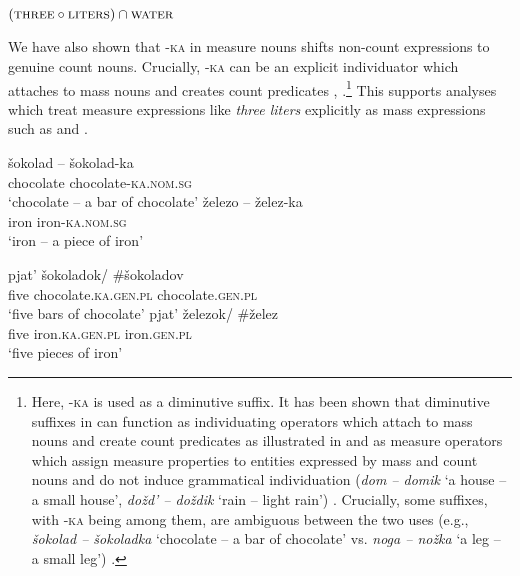 \documentclass[output=paper,
colorlinks,
citecolor=brown,
newtxmath
]{langscibook}
\begin{document}
\ea\label{ex:khrizmann:41} $(\textsc{three}\circ\textsc{liters}) \cap\textsc{water}$
\z

\noindent We have also shown that -\textsc{ka} in measure nouns shifts non-count expressions to genuine count nouns. Crucially, -\textsc{ka} can be an explicit individuator which attaches to mass nouns and creates count predicates \citep{Khrizman2017} , .\footnote{Here, -\textsc{ka} is used as a diminutive suffix. It has been shown that diminutive suffixes in  can function as individuating operators which attach to mass nouns and create count predicates as illustrated in  and as measure operators which assign measure properties to entities expressed by mass and count nouns and do not induce grammatical individuation (\textit{dom -- domik} `a house -- a small house', \textit{\textit{dožd' -- doždik}} `rain -- light rain') \citep{Khrizman2017,Khrizman2019}. Crucially, some suffixes, with -\textsc{ka} being among them, are ambiguous between the two uses (e.g., \textit{šokolad -- šokoladka} `chocolate -- a bar of chocolate' vs. \textit{noga -- nožka} `a leg -- a small leg') \citep{Khrizman2019}.} This supports analyses which treat measure expressions like \textit{three liters} explicitly as mass expressions such as \citet{Khrizman.etal2015} and \citet{Landman2016}.

\begin{exe}
\ex\label{ex:khrizmann:42}
       \begin{xlist}
           \ex\label{ex:khrizmann:42a} \gll šokolad -- šokolad-ka\\
          chocolate {}{} chocolate-\textsc{ka.nom.sg}\\
\glt `chocolate -- a bar of chocolate'
          \ex\label{ex:khrizmann:42b} \gll železo -- želez-ka\\
            iron {}{} iron-\textsc{ka.nom.sg}\\
            \glt `iron -- a piece of iron'\\
        \end{xlist}
\end{exe}


\begin{exe}
\ex\label{ex:khrizmann:43}
       \begin{xlist}
            \ex\label{ex:khrizmann:43a} \gll pjat' šokoladok/ \#šokoladov\\
            five chocolate.\textsc{ka.gen.pl} \phantom{\#}chocolate.\textsc{gen.pl}\\
           \glt `five bars of chocolate'
           \ex\label{ex:khrizmann:43b} \gll pjat' železok/ \#želez\\
            five iron.\textsc{ka.gen.pl} \phantom{\#}iron.\textsc{gen.pl}\\
           \glt `five pieces of iron'\\
       \end{xlist}
\end{exe}
\end{document}
